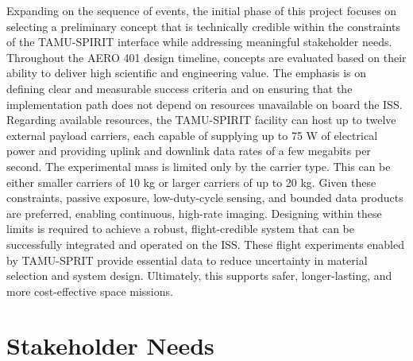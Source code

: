 \documentclass[conf]{new-aiaa}
\begin{document}
Expanding on the sequence of events, the initial phase of this project focuses on selecting a preliminary concept that is technically credible within the constraints of the TAMU-SPIRIT interface while addressing meaningful stakeholder needs.
Throughout the AERO 401 design timeline, concepts are evaluated based on their ability to deliver high scientific and engineering value.
The emphasis is on defining clear and measurable success criteria and on ensuring that the implementation path does not depend on resources unavailable on board the ISS. \\

Regarding available resources, the TAMU-SPIRIT facility can host up to twelve external payload carriers, each capable of supplying up to 75 W of electrical power and providing uplink and downlink data rates of a few megabits per second.
The experimental mass is limited only by the carrier type.
This can be either smaller carriers of 10 kg or larger carriers of up to 20 kg.
Given these constraints, passive exposure, low-duty-cycle sensing, and bounded data products are preferred, enabling continuous, high-rate imaging.
Designing within these limits is required to achieve a robust, flight-credible system that can be successfully integrated and operated on the ISS. These flight experiments enabled by TAMU-SPRIT provide essential data to reduce uncertainty in material selection and system design.
Ultimately, this supports safer, longer-lasting, and more cost-effective space missions.

\clearpage
\section{Stakeholder Needs}
\end{document}
